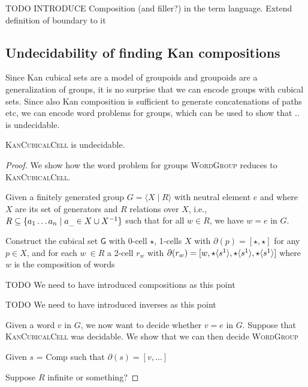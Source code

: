 \documentclass{llncs}
\newcommand{\todo}[1]{
  \begin{tcolorbox}
    TODO {#1} 
  \end{tcolorbox}
}
\newcommand{\myproblem}[1]{\textsc{{#1}}}
\newcommand{\mlist}[1]{[ {#1} ]}
\newcommand{\smap}[1]{s^{{#1}}}
\newcommand{\dmap}[2]{d^{({#1} , {#2})}}
\newcommand{\cont}[2]{\ensuremath{ \ifthenelse{\equal{#2}{}}{#1}{{#1}\langle{#2}\rangle}} }
\newcommand{\cset}[1]{\ensuremath{\mathsf{{#1}}}}
\newcommand{\boundary}[1]{\partial({#1})}
\begin{document}
TODO INTRODUCE Composition (and filler?) in the term language. Extend definition
of boundary to it


\subsection{Undecidability of finding Kan compositions}
\label{ssec:kanundecidable}

Since Kan cubical sets are a model of groupoids and groupoids are a generalization
of groups, it is no surprise that we can encode groups with cubical sets.
Since also Kan composition is sufficient to generate concatenations of paths
etc, we can encode word problems for groups, which can be used to show that ..
is undecidable.
 

\begin{theorem}
  \myproblem{KanCubicalCell} is undecidable.
  \begin{proof} 
    We show how the word problem for groups \myproblem{WordGroup} reduces to
    \myproblem{KanCubicalCell}.

    Given a finitely generated group $G = \langle X \mid R \rangle$ with neutral
    element $e$ and where $X$ are its set of generators and $R$ relations over
    $X$, i.e., $R \subseteq \{ a_1 \mathellipsis a_n \mid a_\_ \in X \cup X^{-1}
    \}$ such that for all $w \in R$, we have $w = e$ in $G$.
    

    Construct the cubical set \cset{G} with 0-cell $\star$, 1-cells $X$ with
    $\boundary{p} = \mlist{\star , \star}$ for any $p \in X$, and for each $w \
    \in R$ a 2-cell $r_w$ with $\boundary{r_w} = \mlist{ w , \cont{\star}{\smap{1}} ,
      \cont{\star}{\smap{1}} , \cont{\star}{\smap{1}}}$ where $w$ is the
    composition of words

    \todo{We need to have introduced compositions as this point}
    \todo{We need to have introduced inverses as this point}

    Given a word $v$ in $G$, we now want to decide whether $v = e$ in $G$.
    Suppose that \myproblem{KanCubicalCell} was decidable. We show that we can
    then decide \myproblem{WordGroup}

    Given $s$ = Comp such that $\boundary{s} = \mlist{ v , ... }$
    
    
    Suppose $R$ infinite or something?



\end{proof}
\end{theorem}
\end{document}
